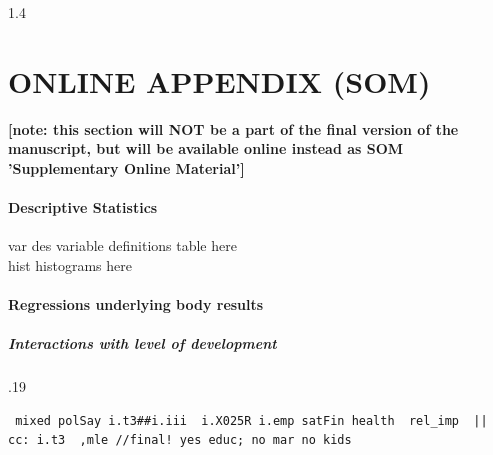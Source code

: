 \documentclass[10pt, letterpaper]{article}
\begin{document}
\begin{spacing}{1.4}
 


\setcounter{section}{0}
 \part*{\Huge ONLINE APPENDIX (SOM)}
 \textbf{[note: this section will NOT be a part of the final version of
   the manuscript, but will be available online instead as SOM 'Supplementary Online
   Material']} %

\tableofcontents
{} 

\subsection{Descriptive Statistics}

var des variable definitions table here\\

hist histograms here\\

\subsection{Regressions underlying body results}

\subsubsection{Interactions with level of development}

\begin{scriptsize}
\begin{spacing}{.19} 
\begin{verbatim}
 mixed polSay i.t3##i.iii  i.X025R i.emp satFin health  rel_imp  || cc: i.t3  ,mle //final! yes educ; no mar no kids


\end{verbatim}
\end{spacing}
\end{scriptsize}
\end{spacing}
\end{document}
